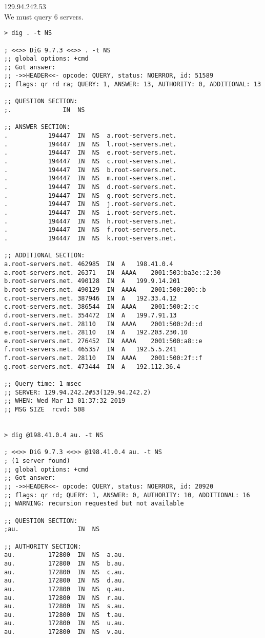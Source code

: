 \documentclass{article}
\begin{document}
129.94.242.53\\
We must query 6 servers.

\begin{lstlisting}
> dig . -t NS 

; <<>> DiG 9.7.3 <<>> . -t NS
;; global options: +cmd
;; Got answer:
;; ->>HEADER<<- opcode: QUERY, status: NOERROR, id: 51589
;; flags: qr rd ra; QUERY: 1, ANSWER: 13, AUTHORITY: 0, ADDITIONAL: 13

;; QUESTION SECTION:
;.				IN	NS

;; ANSWER SECTION:
.			194447	IN	NS	a.root-servers.net.
.			194447	IN	NS	l.root-servers.net.
.			194447	IN	NS	e.root-servers.net.
.			194447	IN	NS	c.root-servers.net.
.			194447	IN	NS	b.root-servers.net.
.			194447	IN	NS	m.root-servers.net.
.			194447	IN	NS	d.root-servers.net.
.			194447	IN	NS	g.root-servers.net.
.			194447	IN	NS	j.root-servers.net.
.			194447	IN	NS	i.root-servers.net.
.			194447	IN	NS	h.root-servers.net.
.			194447	IN	NS	f.root-servers.net.
.			194447	IN	NS	k.root-servers.net.

;; ADDITIONAL SECTION:
a.root-servers.net.	462985	IN	A	198.41.0.4
a.root-servers.net.	26371	IN	AAAA	2001:503:ba3e::2:30
b.root-servers.net.	490128	IN	A	199.9.14.201
b.root-servers.net.	490129	IN	AAAA	2001:500:200::b
c.root-servers.net.	387946	IN	A	192.33.4.12
c.root-servers.net.	386544	IN	AAAA	2001:500:2::c
d.root-servers.net.	354472	IN	A	199.7.91.13
d.root-servers.net.	28110	IN	AAAA	2001:500:2d::d
e.root-servers.net.	28110	IN	A	192.203.230.10
e.root-servers.net.	276452	IN	AAAA	2001:500:a8::e
f.root-servers.net.	465357	IN	A	192.5.5.241
f.root-servers.net.	28110	IN	AAAA	2001:500:2f::f
g.root-servers.net.	473444	IN	A	192.112.36.4

;; Query time: 1 msec
;; SERVER: 129.94.242.2#53(129.94.242.2)
;; WHEN: Wed Mar 13 01:37:32 2019
;; MSG SIZE  rcvd: 508


> dig @198.41.0.4 au. -t NS

; <<>> DiG 9.7.3 <<>> @198.41.0.4 au. -t NS
; (1 server found)
;; global options: +cmd
;; Got answer:
;; ->>HEADER<<- opcode: QUERY, status: NOERROR, id: 20920
;; flags: qr rd; QUERY: 1, ANSWER: 0, AUTHORITY: 10, ADDITIONAL: 16
;; WARNING: recursion requested but not available

;; QUESTION SECTION:
;au.				IN	NS

;; AUTHORITY SECTION:
au.			172800	IN	NS	a.au.
au.			172800	IN	NS	b.au.
au.			172800	IN	NS	c.au.
au.			172800	IN	NS	d.au.
au.			172800	IN	NS	q.au.
au.			172800	IN	NS	r.au.
au.			172800	IN	NS	s.au.
au.			172800	IN	NS	t.au.
au.			172800	IN	NS	u.au.
au.			172800	IN	NS	v.au.


\end{lstlisting}
\end{document}
